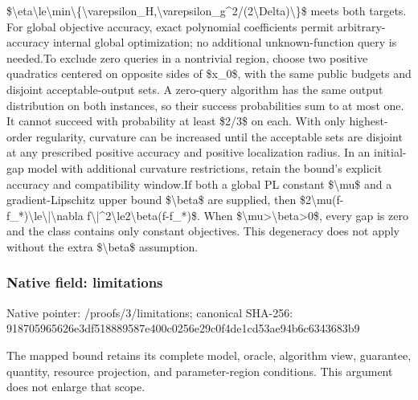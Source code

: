 \documentclass[10pt,a4paper]{article}
\begin{document}
\$\textbackslash{}eta\textbackslash{}le\textbackslash{}min\textbackslash{}\{\textbackslash{}varepsilon\_\allowbreak{}H,\allowbreak{}\textbackslash{}varepsilon\_\allowbreak{}g\textasciicircum{}2/\allowbreak{}(2\textbackslash{}Delta)\textbackslash{}\}\$ meets both targets. For global objective accuracy,\allowbreak{} exact polynomial coefficients permit arbitrary-accuracy internal global optimization;\allowbreak{} no additional unknown-function query is needed.\newline{}\newline{}To exclude zero queries in a nontrivial region,\allowbreak{} choose two positive quadratics centered on opposite sides of \$x\_\allowbreak{}0\$,\allowbreak{} with the same public budgets and disjoint acceptable-output sets. A zero-query algorithm has the same output distribution on both instances,\allowbreak{} so their success probabilities sum to at most one. It cannot succeed with probability at least \$2/\allowbreak{}3\$ on each. With only highest-order regularity,\allowbreak{} curvature can be increased until the acceptable sets are disjoint at any prescribed positive accuracy and positive localization radius. In an initial-gap model with additional curvature restrictions,\allowbreak{} retain the bound's explicit accuracy and compatibility window.\newline{}\newline{}If both a global PL constant \$\textbackslash{}mu\$ and a gradient-Lipschitz upper bound \$\textbackslash{}beta\$ are supplied,\allowbreak{} then \$2\textbackslash{}mu(f-f\_\allowbreak{}*)\textbackslash{}le\textbackslash{}|\textbackslash{}nabla f\textbackslash{}|\textasciicircum{}2\textbackslash{}le2\textbackslash{}beta(f-f\_\allowbreak{}*)\$. When \$\textbackslash{}mu>\textbackslash{}beta>0\$,\allowbreak{} every gap is zero and the class contains only constant objectives. This degeneracy does not apply without the extra \$\textbackslash{}beta\$ assumption.\par\endgroup

\subsubsection{Native field: limitations}
Native pointer: /proofs/3/limitations; canonical SHA-256: 918705965626e3df518889587e400c0256e29c0f4de1cd53ae94b6c6343683b9

\begingroup\raggedright\sloppy The mapped bound retains its complete model,\allowbreak{} oracle,\allowbreak{} algorithm view,\allowbreak{} guarantee,\allowbreak{} quantity,\allowbreak{} resource projection,\allowbreak{} and parameter-region conditions. This argument does not enlarge that scope.\par\endgroup
\end{document}
